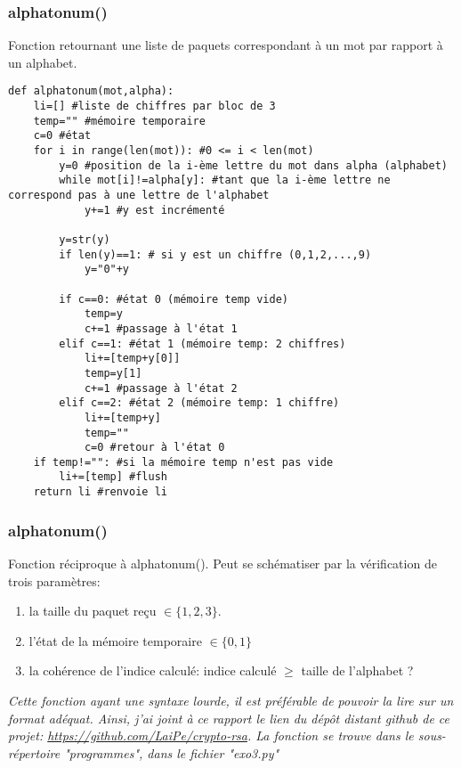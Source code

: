 \documentclass[10pt,a4paper,french]{article}
\begin{document}
\subsubsection{alphatonum()}
Fonction retournant une liste de paquets correspondant à un mot par rapport à un alphabet.
\begin{lstlisting}
def alphatonum(mot,alpha):
    li=[] #liste de chiffres par bloc de 3
    temp="" #mémoire temporaire
    c=0 #état
    for i in range(len(mot)): #0 <= i < len(mot)
        y=0 #position de la i-ème lettre du mot dans alpha (alphabet)
        while mot[i]!=alpha[y]: #tant que la i-ème lettre ne correspond pas à une lettre de l'alphabet
            y+=1 #y est incrémenté

        y=str(y)
        if len(y)==1: # si y est un chiffre (0,1,2,...,9)
            y="0"+y

        if c==0: #état 0 (mémoire temp vide)
            temp=y
            c+=1 #passage à l'état 1
        elif c==1: #état 1 (mémoire temp: 2 chiffres)
            li+=[temp+y[0]]
            temp=y[1]
            c+=1 #passage à l'état 2
        elif c==2: #état 2 (mémoire temp: 1 chiffre)
            li+=[temp+y]
            temp=""
            c=0 #retour à l'état 0
    if temp!="": #si la mémoire temp n'est pas vide
        li+=[temp] #flush
    return li #renvoie li
\end{lstlisting}
\subsubsection{alphatonum()}
Fonction réciproque à alphatonum(). Peut se schématiser par la vérification de trois paramètres:
\begin{enumerate}
\item la taille du paquet reçu $\in \{1,2,3\}$.
\item l'état de la mémoire temporaire $\in \{0,1\}$
\item la cohérence de l'indice calculé: indice calculé $\geqslant$ taille de l'alphabet ?

\end{enumerate}
\textit{Cette fonction ayant une syntaxe lourde, il est préférable de pouvoir la lire sur un format adéquat. Ainsi, j'ai joint à ce rapport le lien du dépôt distant github de ce projet: \url{https://github.com/LaiPe/crypto-rsa}. La fonction se trouve dans le sous-répertoire "programmes", dans le fichier "exo3.py"}
\end{document}
